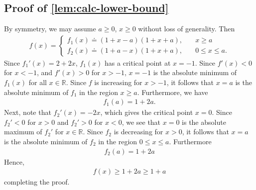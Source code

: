 \documentclass[12pt,reqno]{amsart}
\numberwithin{equation}{section}  %
\newcommand{\rr}{\mathbb{R}}
\begin{document}
\begin{appendices}
\subsection{Proof of \cref{lem:calc-lower-bound}}
\label{ssec:simp-est-proof}
By symmetry, we may assume $ a \ge 0$, $x \ge 0$ without loss of generality.
Then
%
%
\begin{equation*}
\begin{split}
f(x) = 
\begin{cases}
  f_{1}(x) \doteq (1 + x-a)(1 + x + a), \quad & x \ge a \\
  f_{2}(x) \doteq (1 + a -x)(1 + x + a), \quad & 0 \le x \le a.
\end{cases}
\end{split}
\end{equation*}
%
%
Since $f_{1}'(x) = 2 + 2x$, $f_{1}(x)$ has a critical point at $x=-1$. Since
$f'(x) < 0$ for $x <-1$, and $f'(x) > 0$ for $x > -1$, $x=-1$ is the absolute
minimum of $f_{1}(x)$ for all $x \in \rr$. Since $f$ is increasing for $x > -1$,
it follows that $x=a$ is the absolute minimum of $f_{1}$ in the region $x \ge
a$. Furthermore, we have
%
%
\begin{equation*}
\begin{split}
  f_{1}(a) = 1 + 2 a.
\end{split}
\end{equation*}
%
%
Next, note that $f_{2}'(x) = -2x$, which gives the critical point $x = 0$. Since
$f_{2}' < 0$ for $x>0$ and $f_{2}' > 0$ for $x < 0$, we see that $x=0$ is
the absolute maximum of $f_{2}'$ for  $x \in \rr$. Since $f_{2}$ is decreasing
for $x > 0$, it follows that $x = a$
is the absolute minimum of $f_{2}$ in the region $0 \le x \le a$. Furthermore
%
%
\begin{equation*}
\begin{split}
  f_{2}(a) = 1 + 2 a
\end{split}
\end{equation*}
%
%
Hence, 
%
%
\begin{equation*}
\begin{split}
f(x) \ge 1 + 2a \ge 1 + a
\end{split}
\end{equation*}
%
%
completing the proof. \qquad \qedsymbol
%

\end{appendices}
\end{document}
